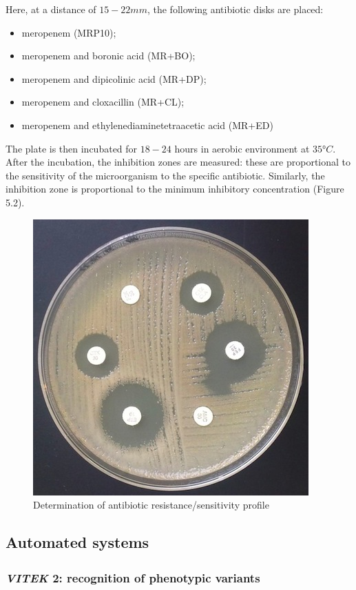 \documentclass[11pt]{report}
\begin{document}
Here, at a distance of $15-22 mm$, the following antibiotic disks are placed:
\begin{itemize}
\item meropenem (MRP10);
\item meropenem and boronic acid (MR+BO);
\item meropenem and dipicolinic acid (MR+DP);
\item meropenem and cloxacillin (MR+CL);
\item meropenem and ethylenediaminetetraacetic acid (MR+ED)
\end{itemize}

The plate is then incubated for $18-24$ hours in aerobic environment at $35°C$.
After the incubation, the inhibition zones are measured: these are proportional to the sensitivity of the microorganism to the specific antibiotic. 
Similarly, the inhibition zone is proportional to the minimum inhibitory concentration (Figure 5.2).

\begin{figure}[htp]
\centering
\includegraphics[scale=0.93]{img/5disks.jpg}
\caption{Determination of antibiotic resistance/sensitivity profile}
\label{}
\end{figure}

\clearpage
\subsection{Automated systems}
\subsubsection{\emph{VITEK}\textsuperscript{\textregistered} 2: recognition of phenotypic variants}
\end{document}
